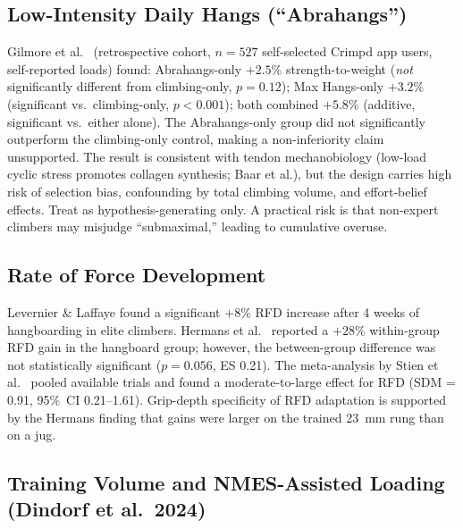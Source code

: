 \documentclass[12pt,a4paper]{article}
\begin{document}
\subsection{Low-Intensity Daily Hangs (``Abrahangs'')}

\begin{bioplausbox}[title=Observational: Low-Intensity Daily Hangs (Gilmore et al.\ 2024)]
Gilmore et al.\ \cite{gilmore2024} (retrospective cohort, $n = 527$ self-selected Crimpd app users, self-reported loads) found: Abrahangs-only $+2.5\%$ strength-to-weight (\textit{not} significantly different from climbing-only, $p = 0.12$); Max Hangs-only $+3.2\%$ (significant vs.\ climbing-only, $p < 0.001$); both combined $+5.8\%$ (additive, significant vs.\ either alone). The Abrahangs-only group did not significantly outperform the climbing-only control, making a non-inferiority claim unsupported. The result is consistent with tendon mechanobiology (low-load cyclic stress promotes collagen synthesis; Baar et al.), but the design carries high risk of selection bias, confounding by total climbing volume, and effort-belief effects. Treat as hypothesis-generating only. A practical risk is that non-expert climbers may misjudge ``submaximal,'' leading to cumulative overuse.
\end{bioplausbox}

\subsection{Rate of Force Development}

\begin{evidencebox}
Levernier \& Laffaye \cite{levernier2019} found a significant $+8\%$ RFD increase after 4 weeks of hangboarding in elite climbers. Hermans et al.\ \cite{hermans2022} reported a $+28\%$ within-group RFD gain in the hangboard group; however, the between-group difference was not statistically significant ($p = 0.056$, ES 0.21). The meta-analysis by Stien et al.\ \cite{stien2023} pooled available trials and found a moderate-to-large effect for RFD (SDM = 0.91, 95\%~CI 0.21--1.61). Grip-depth specificity of RFD adaptation is supported by the Hermans finding that gains were larger on the trained 23~mm rung than on a jug.
\end{evidencebox}

\subsection{Training Volume and NMES-Assisted Loading (Dindorf et al.\ 2024)}
\end{document}
